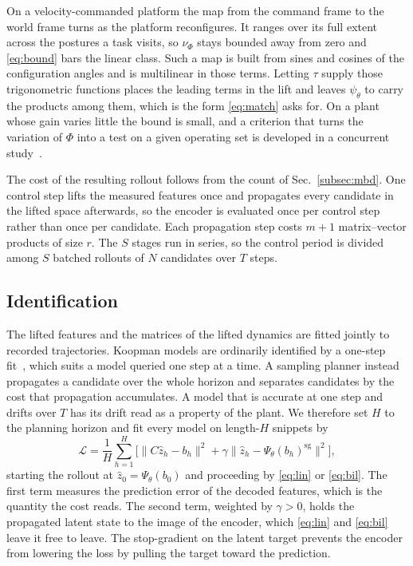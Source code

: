 \documentclass[letterpaper,10pt,conference]{ieeeconf}
\begin{document}
On a velocity-commanded platform the map from the command frame to the world frame turns as the platform reconfigures.
It ranges over its full extent across the postures a task visits, so $\nu_\Phi$ stays bounded away from zero and \eqref{eq:bound} bars the linear class.
Such a map is built from sines and cosines of the configuration angles and is multilinear in those terms.
Letting $\tau$ supply those trigonometric functions places the leading terms in the lift and leaves $\psi_\theta$ to carry the products among them, which is the form \eqref{eq:match} asks for.
On a plant whose gain varies little the bound is small, and a criterion that turns the variation of $\Phi$ into a test on a given operating set is developed in a concurrent study~\cite{kim2026bilinear}.

The cost of the resulting rollout follows from the count of Sec.~\ref{subsec:mbd}.
One control step lifts the measured features once and propagates every candidate in the lifted space afterwards, so the encoder is evaluated once per control step rather than once per candidate.
Each propagation step costs $m+1$ matrix--vector products of size $r$.
The $S$ stages run in series, so the control period is divided among $S$ batched rollouts of $N$ candidates over $T$ steps.

\subsection{Identification}\label{subsec:training}

The lifted features and the matrices of the lifted dynamics are fitted jointly to recorded trajectories.
Koopman models are ordinarily identified by a one-step fit~\cite{lusch2018deep}, which suits a model queried one step at a time.
A sampling planner instead propagates a candidate over the whole horizon and separates candidates by the cost that propagation accumulates.
A model that is accurate at one step and drifts over $T$ has its drift read as a property of the plant.
We therefore set $H$ to the planning horizon and fit every model on length-$H$ snippets by
\begin{equation}
\mathcal{L} = \frac{1}{H} \sum_{h=1}^{H}
\Big[ \big\| C \hat{z}_h - b_h \big\|^{2}
+ \gamma \big\| \hat{z}_h - \Psi_\theta(b_h)^{\mathrm{sg}} \big\|^{2} \Big] ,
\label{eq:loss}
\end{equation}
starting the rollout at $\hat z_0 = \Psi_\theta(b_0)$ and proceeding by \eqref{eq:lin} or \eqref{eq:bil}.
The first term measures the prediction error of the decoded features, which is the quantity the cost reads.
The second term, weighted by $\gamma > 0$, holds the propagated latent state to the image of the encoder, which \eqref{eq:lin} and \eqref{eq:bil} leave it free to leave.
The stop-gradient on the latent target prevents the encoder from lowering the loss by pulling the target toward the prediction.
\end{document}
